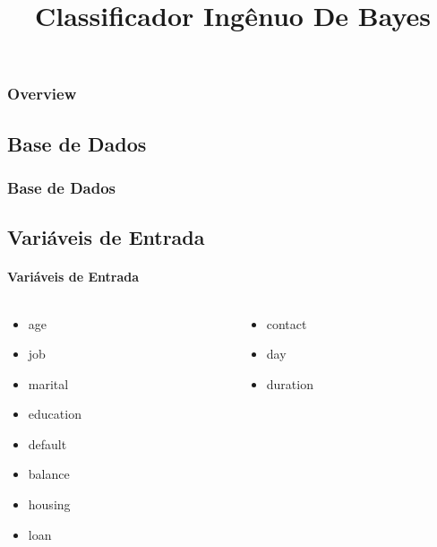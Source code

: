 \documentclass{beamer}
\title{Classificador Ingênuo De Bayes}
\begin{document}
\maketitle

\begin{frame}[allowframebreaks]
\frametitle{Overview}
\tableofcontents
\end{frame}

\begin{frame}
\section{Base de Dados}
\frametitle{Base de Dados}
\subsection{Variáveis de Entrada}
\framesubtitle{Variáveis de Entrada}

\begin{columns}
    \begin{column}{0.5\textwidth}
        \begin{itemize}
            \item age
        
            \item job
        
            \item marital
        
            \item education
        
            \item default
        
            \item balance 
        
            \item housing
        
            \item loan
        
     
        \end{itemize}
    \end{column}
    \begin{column}{0.5\textwidth}
        \begin{itemize}
            \item contact
            
            \item day 
        
            \item duration
        

\end{itemize}
\end{column}
\end{columns}
\end{frame}
\end{document}
